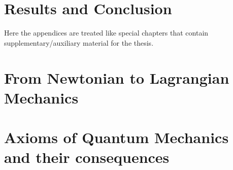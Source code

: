\documentclass[12pt,titlepage,oneside]{book}
\newcommand{\tcg}[1]{\textcolor{GRASSGREEN}{#1}} %
\begin{document}
\chapter{Results and Conclusion}
\label{chap:conc}
%
 
\begin{appendices}
\tcg{Here the appendices are treated like special chapters that contain supplementary/auxiliary material for the thesis.}

\chapter{From Newtonian to Lagrangian\\ Mechanics}
\label{app:C2L}
%

\chapter{Axioms of Quantum Mechanics and their consequences}
\label{app:QM}
%

\end{appendices}
\backmatter  %

\begingroup
\raggedright
\sloppy
\printbibliography
\endgroup
\end{document}
